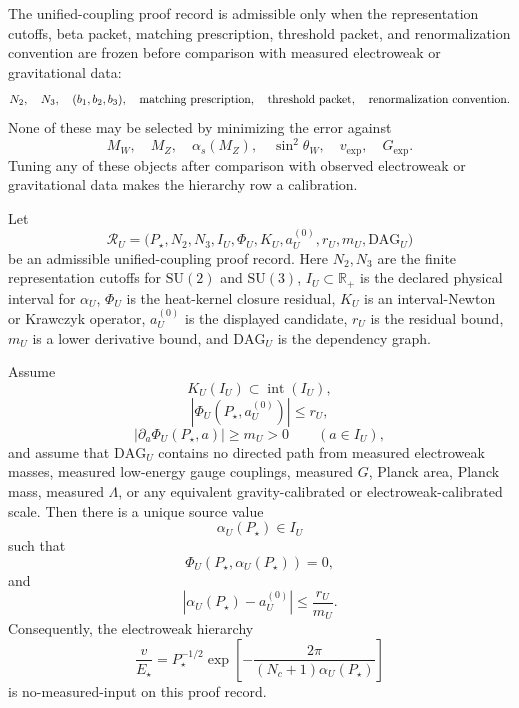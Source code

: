 \begin{definition}\label{def:no-hidden-free-variable-u}
The unified-coupling proof record is admissible only when the representation cutoffs, beta packet,
matching prescription, threshold packet, and renormalization convention are frozen before
comparison with measured electroweak or gravitational data:
\[
N_2,\quad N_3,\quad (b_1,b_2,b_3),\quad
\hbox{matching prescription},\quad
\hbox{threshold packet},\quad
\hbox{renormalization convention}.
\]
None of these may be selected by minimizing the error against
\[
M_W,\quad M_Z,\quad \alpha_s(M_Z),\quad \sin^2\theta_W,\quad v_{\mathrm{exp}},
\quad G_{\mathrm{exp}}.
\]
Tuning any of these objects after comparison with observed electroweak or gravitational data
makes the hierarchy row a calibration.
\end{definition}

\begin{theorem}\label{thm:no-input-alpha-u}
Let
\[
\mathcal R_U
=
\bigl(
P_\star,
N_2,N_3,
I_U,
\Phi_U,
K_U,
a_U^{(0)},
r_U,
m_U,
\mathrm{DAG}_U
\bigr)
\]
be an admissible unified-coupling proof record. Here \(N_2,N_3\) are the finite
representation cutoffs for \(\mathrm{SU}(2)\) and \(\mathrm{SU}(3)\), \(I_U\subset\mathbb R_+\)
is the declared physical interval for \(\alpha_U\), \(\Phi_U\) is the heat-kernel closure
residual, \(K_U\) is an interval-Newton or Krawczyk operator, \(a_U^{(0)}\) is the displayed
candidate, \(r_U\) is the residual bound, \(m_U\) is a lower derivative bound, and
\(\mathrm{DAG}_U\) is the dependency graph.

Assume
\[
K_U(I_U)\subset \operatorname{int}(I_U),
\]
\[
|\Phi_U(P_\star,a_U^{(0)})|\le r_U,
\]
\[
|\partial_a\Phi_U(P_\star,a)|\ge m_U>0
\qquad
(a\in I_U),
\]
and assume that \(\mathrm{DAG}_U\) contains no directed path from measured electroweak masses,
measured low-energy gauge couplings, measured \(G\), Planck area, Planck mass, measured
\(\Lambda\), or any equivalent gravity-calibrated or electroweak-calibrated scale. Then there is
a unique source value
\[
\alpha_U(P_\star)\in I_U
\]
such that
\[
\Phi_U(P_\star,\alpha_U(P_\star))=0,
\]
and
\[
|\alpha_U(P_\star)-a_U^{(0)}|
\le
\frac{r_U}{m_U}.
\]
Consequently, the electroweak hierarchy
\[
\frac{v}{E_\star}
=
P_\star^{-1/2}
\exp\!\left[
-\frac{2\pi}{(N_c+1)\alpha_U(P_\star)}
\right]
\]
is no-measured-input on this proof record.
\end{theorem}

